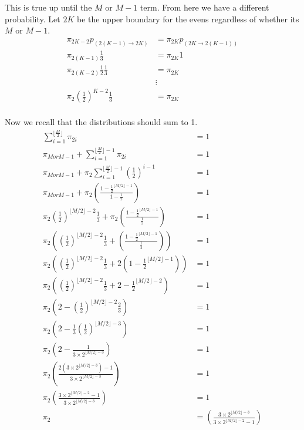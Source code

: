 \documentclass{article}
\begin{document}
This is true up until the $M$ or $M-1$ term. From here we have a different
probability. Let $2K$ be the upper boundary for the evens regardless of whether
its $M$ or $M-1$.
\begin{align*}
    \pi_{2K-2} p_{(2(K-1) \to 2K)} &= \pi_{2K} p_{(2K \to 2(K-1))} \\
    \pi_{2(K-1)} \frac{1}{3} &= \pi_{2K} 1 \\
    \pi_{2(K-2)} \frac{1}{2} \frac{1}{3} &= \pi_{2K} \\
    &\vdots \\
    \pi_2 {\left(\frac{1}{2}\right)}^{K-2} \frac{1}{3} &= \pi_{2K} \\
\end{align*}

Now we recall that the distributions should sum to 1.
\begin{align*}
    \sum_{i=1}^{\lfloor \frac{M}{2} \rfloor} \pi_{2i} &= 1 \\
    \pi_{M or M-1} + \sum_{i=1}^{\lfloor \frac{M}{2} \rfloor - 1} \pi_{2i} &= 1 \\
    \pi_{M or M-1} + \pi_{2} \sum_{i=1}^{\lfloor \frac{M}{2} \rfloor - 1}
    {\left(\frac{1}{2}\right)}^{i-1} &= 1 \\
    \pi_{M or M-1} + \pi_2
    {\left(\frac{1-\frac{1}{2}^{\lfloor M/2 \rfloor - 1}}{1 - \frac{1}{2}}\right)}
    &= 1 \\
    \pi_2 {\left(\frac{1}{2}\right)}^{\lfloor M/2 \rfloor - 2} \frac{1}{3}
    + \pi_2 {\left(\frac{1-\frac{1}{2}^{\lfloor M/2 \rfloor - 1}}
    {\frac{1}{2}}\right)}
    &= 1 \\
    \pi_2 \left({\left(\frac{1}{2}\right)}^{\lfloor M/2 \rfloor - 2} \frac{1}{3}
    + {\left(\frac{1-\frac{1}{2}^{\lfloor M/2 \rfloor - 1}}{\frac{1}{2}}\right)}\right)
    &= 1 \\
    \pi_2 \left({\left(\frac{1}{2}\right)}^{\lfloor M/2 \rfloor - 2} \frac{1}{3}
    + 2\left(1-\frac{1}{2}^{\lfloor M/2 \rfloor - 1}\right)\right)
    &= 1 \\
    \pi_2 \left({\left(\frac{1}{2}\right)}^{\lfloor M/2 \rfloor - 2} \frac{1}{3}
    + 2 - \frac{1}{2}^{\lfloor M/2 \rfloor - 2}\right)
    &= 1 \\
    \pi_2
    \left({2 - \left(\frac{1}{2}\right)}^{\lfloor M/2 \rfloor - 2} \frac{2}{3} \right)
    &= 1 \\
    \pi_2 \left(2 - \frac{1}{3}{\left(\frac{1}{2}\right)}^{\lfloor M/2 \rfloor - 3}
    \right)
    &= 1 \\
    \pi_2 \left(2 - \frac{1}{3 \times 2^{\lfloor M/2 \rfloor - 3}}\right)
    &= 1 \\
    \pi_2 \left(\frac{2\left(3 \times 2^{\lfloor M/2 \rfloor - 3}\right)-1}{3 \times 2^{\lfloor M/2 \rfloor - 3}}\right)
    &= 1 \\
    \pi_2 \left(\frac{3 \times 2^{\lfloor M/2 \rfloor - 2}-1}{3 \times 2^{\lfloor M/2 \rfloor - 3}}\right)
    &= 1 \\
    \pi_2
    &= \left(\frac{3 \times 2^{\lfloor M/2 \rfloor - 3}}
    {3 \times 2^{\lfloor M/2 \rfloor - 2}-1}\right) \\
\end{align*}
\end{document}
